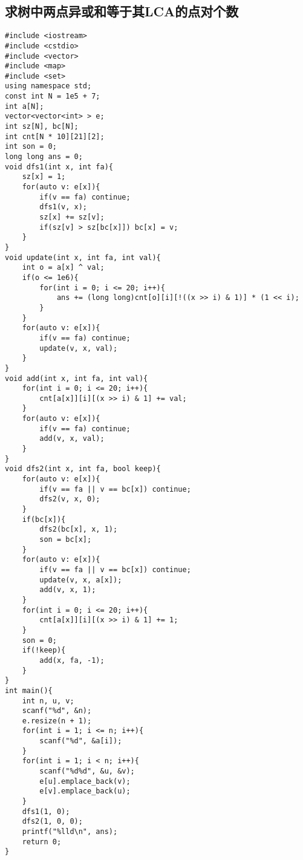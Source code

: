 \subsection{求树中两点异或和等于其LCA的点对个数}
\begin{lstlisting}
#include <iostream>
#include <cstdio>
#include <vector>
#include <map>
#include <set>
using namespace std;
const int N = 1e5 + 7;
int a[N];
vector<vector<int> > e;
int sz[N], bc[N];
int cnt[N * 10][21][2];
int son = 0;
long long ans = 0;
void dfs1(int x, int fa){
    sz[x] = 1;
    for(auto v: e[x]){
        if(v == fa) continue;
        dfs1(v, x);
        sz[x] += sz[v];
        if(sz[v] > sz[bc[x]]) bc[x] = v;
    }
}
void update(int x, int fa, int val){
    int o = a[x] ^ val;
    if(o <= 1e6){
        for(int i = 0; i <= 20; i++){
            ans += (long long)cnt[o][i][!((x >> i) & 1)] * (1 << i);
        }
    }
    for(auto v: e[x]){
        if(v == fa) continue;
        update(v, x, val);
    }
}
void add(int x, int fa, int val){
    for(int i = 0; i <= 20; i++){
        cnt[a[x]][i][(x >> i) & 1] += val;
    }
    for(auto v: e[x]){
        if(v == fa) continue;
        add(v, x, val);
    }
}
void dfs2(int x, int fa, bool keep){
    for(auto v: e[x]){
        if(v == fa || v == bc[x]) continue;
        dfs2(v, x, 0);
    }
    if(bc[x]){
        dfs2(bc[x], x, 1);
        son = bc[x];
    }
    for(auto v: e[x]){
        if(v == fa || v == bc[x]) continue;
        update(v, x, a[x]);
        add(v, x, 1);
    }
    for(int i = 0; i <= 20; i++){
        cnt[a[x]][i][(x >> i) & 1] += 1;
    }
    son = 0;
    if(!keep){
        add(x, fa, -1);
    }
}
int main(){
    int n, u, v;
    scanf("%d", &n);
    e.resize(n + 1);
    for(int i = 1; i <= n; i++){
        scanf("%d", &a[i]);
    }
    for(int i = 1; i < n; i++){
        scanf("%d%d", &u, &v);
        e[u].emplace_back(v);
        e[v].emplace_back(u);
    }
    dfs1(1, 0);
    dfs2(1, 0, 0);
    printf("%lld\n", ans);
    return 0;
}
\end{lstlisting}

